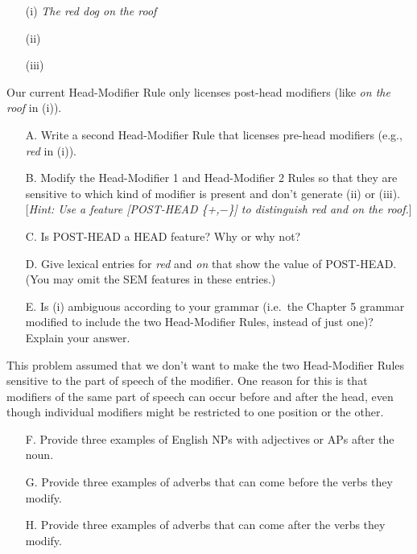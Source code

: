 \documentclass[a4paper,landscape,headrule,footrule]{foils}
\begin{document}
\begin{itemize}
\item[(i)] \textit{The red dog on the roof}
\item[(ii)]  
\item[(iii)]  
\end{itemize}
%
Our current Head-Modifier Rule only licenses post-head modifiers
(like {\it on the roof} in (i)).

\newpage 
\begin{itemize}
\item[A.] Write a second Head-Modifier Rule that licenses
pre-head modifiers
(e.g., {\it red} in (i)).
\item[B.] Modify the Head-Modifier 1 and Head-Modifier 2 Rules so that
they are sensitive to which kind of modifier is present and don't
generate (ii) or (iii).  [\textsl{Hint: Use a feature
{\rm [}POST-HEAD \{+,$-$\}{\rm ]} to distinguish {\it red} and {\it on the roof}.}]
\item[C.] Is POST-HEAD a HEAD feature? Why or why not? 
\item[D.] Give lexical entries for {\it red} and {\it on} that show
the value of POST-HEAD. (You may omit the SEM features in these entries.)
\item[E.] Is (i) ambiguous according to your grammar (i.e.\ 
the Chapter 5 grammar modified to include the two Head-Modifier Rules,
instead of just one)? Explain your answer.  
\end{itemize}

This problem assumed that we don't want to make the two Head-Modifier
Rules sensitive to the part of speech of the modifier.  One reason for
this is that modifiers of the same part of speech can occur before and
after the head, even though individual modifiers might be restricted
to one position or the other.

\begin{itemize}
\item[F.] Provide three examples of English NPs with
adjectives or APs after the noun. 
\item[G.] Provide three examples of adverbs that can come before 
the verbs they modify.
\item[H.] Provide three examples of adverbs that can come after
the verbs they modify.
\end{itemize}
\end{document}
